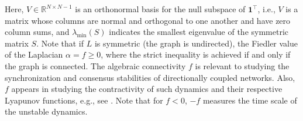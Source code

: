 \documentclass[%
 reprint,
 amsmath,amssymb,
 aip,
]{revtex4-2}
\def \bone {\pmb{1}}
\theoremstyle{italichead}
\theoremstyle{definition}
\begin{document}
{Here, $V \in \mathbb{R}^{N \times N-1}$ is an orthonormal basis for the null subspace of $\bone^\top$, i.e., $V$ is a matrix whose columns are normal and orthogonal to one another and have zero column sums, and $\lambda_{\min}(S)$ indicates the smallest eigenvalue of the symmetric matrix $S$.
Note that if $L$ is symmetric (the graph is undirected), the {Fiedler value of the Laplacian $\alpha = f \geq 0$,} where the strict inequality is achieved if and only if the graph is connected.
    The algebraic connectivity $f$ is relevant to studying the synchronization and consensus stabilities of directionally coupled networks. 
    Also, $f$ appears in studying the contractivity of such dynamics and their respective Lyapunov functions, e.g., see \cite[Corollary 4.23]{wu2007synchronization}. 
    Note that for $f<0$, $-{f}$ measures the time scale of the unstable dynamics.







}
\end{document}
